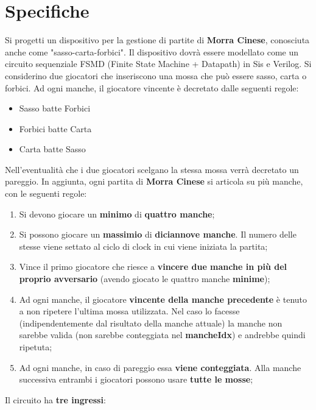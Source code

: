 \documentclass[a4paper]{article}
\begin{document}


\tableofcontents
\pagebreak

\section{Specifiche}
Si progetti un dispositivo per la gestione di partite di \textbf{Morra Cinese}, conosciuta anche come "sasso-carta-forbici".
Il dispositivo dovrà essere modellato come un circuito sequenziale FSMD (Finite State Machine + Datapath) in Sis e Verilog.
Si considerino due giocatori che inseriscono una mossa che può essere sasso, carta o forbici. Ad ogni manche, il giocatore vincente è decretato dalle seguenti regole:
\begin{itemize}
	\item Sasso batte Forbici
	\item Forbici batte Carta
	\item Carta batte Sasso
\end{itemize}
Nell'eventualità che i due giocatori scelgano la stessa mossa verrà decretato un pareggio.
In aggiunta, ogni partita di \textbf{Morra Cinese} si articola su più manche, con le seguenti regole:
\begin{enumerate}
	\item Si devono giocare un \textbf{minimo} di \textbf{quattro manche};
	\item Si possono giocare un \textbf{massimio} di \textbf{diciannove manche}. Il numero delle stesse viene settato al ciclo di clock in cui viene iniziata la partita;
	\item Vince il primo giocatore che riesce a \textbf{vincere due manche in più del proprio avversario} (avendo giocato le quattro manche \textbf{minime});
	\item Ad ogni manche, il giocatore \textbf{vincente della manche precedente} è tenuto a non ripetere l'ultima mossa utilizzata. Nel caso lo facesse (indipendentemente dal risultato della manche attuale) la manche non sarebbe valida (non sarebbe conteggiata nel \textbf{mancheIdx}) e andrebbe quindi ripetuta;
	\item Ad ogni manche, in caso di pareggio essa \textbf{viene conteggiata}. Alla manche successiva entrambi i giocatori possono usare \textbf{tutte le mosse};
\end{enumerate}
Il circuito ha \textbf{tre ingressi}:
\end{document}
